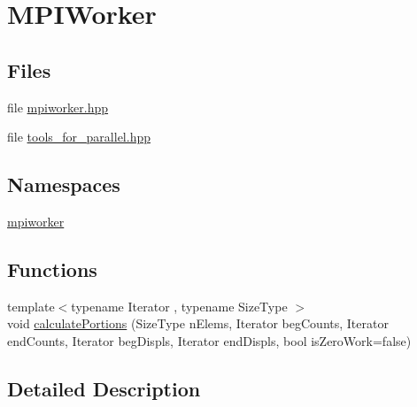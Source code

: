 \hypertarget{group__MPIWorker}{\section{M\-P\-I\-Worker}
\label{group__MPIWorker}
}
\subsection*{Files}
\begin{DoxyCompactItemize}
\item 
file \hyperlink{mpiworker_8hpp}{mpiworker.\-hpp}
\item 
file \hyperlink{tools__for__parallel_8hpp}{tools\-\_\-for\-\_\-parallel.\-hpp}
\end{DoxyCompactItemize}
\subsection*{Namespaces}
\begin{DoxyCompactItemize}
\item 
\hyperlink{namespacempiworker}{mpiworker}
\end{DoxyCompactItemize}
\subsection*{Functions}
\begin{DoxyCompactItemize}
\item 
{\footnotesize template$<$typename Iterator , typename Size\-Type $>$ }\\void \hyperlink{group__MPIWorker_ga6fd8303c1b4e39a4a623756fdcbeae6f}{calculate\-Portions} (Size\-Type n\-Elems, Iterator beg\-Counts, Iterator end\-Counts, Iterator beg\-Displs, Iterator end\-Displs, bool is\-Zero\-Work=false)
\end{DoxyCompactItemize}


\subsection{Detailed Description}


